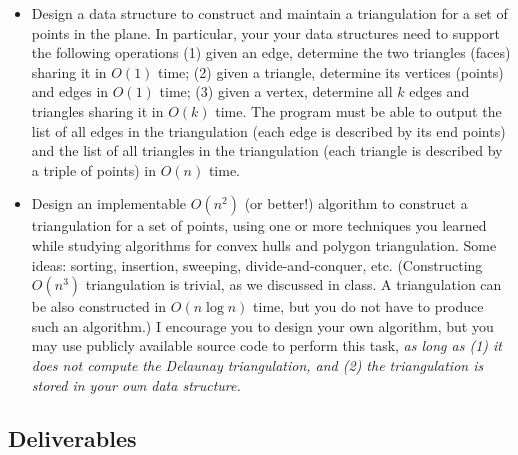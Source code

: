 \documentclass[11pt]{article}
\begin{document}
\begin{itemize}
\item Design a data structure to construct and maintain a
triangulation for a set of points  in the plane. In particular,
your your data structures need to support the following operations
(1) given an edge,
determine the two triangles (faces) sharing it in $O(1)$ time; (2) given a
triangle, determine its vertices (points) and edges in $O(1)$ time; (3) given a
vertex, determine all $k$ edges and triangles sharing it in $O(k)$ time.  The program
must be able to output the list of all edges in the triangulation
(each edge is described by its end points) and the list of all
triangles in the triangulation (each triangle is described by a
triple of points) in $O(n)$ time.

\item Design  an implementable $O(n^2)$ (or better!) algorithm to
construct a triangulation for a set  of points, using one or more
techniques you learned while  studying  algorithms for convex
hulls and polygon triangulation.  Some ideas:  sorting, insertion,
sweeping, divide-and-conquer, etc. (Constructing $O(n^3)$
triangulation is trivial, as we discussed in class. A
triangulation can be also constructed in $O(n \log n)$ time, but
you do not have to produce such an algorithm.)  I encourage you 
to design your own algorithm,  but you  may use
publicly available source code to perform this task, {\em as long
as (1) it does not compute the Delaunay triangulation, and (2) the triangulation is stored in 
your own data structure.}



\end{itemize}

\subsection*{Deliverables}
\end{document}
